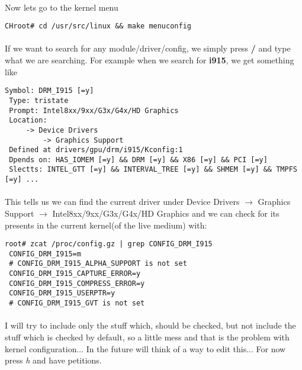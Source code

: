 \documentclass[11pt,a4paper]{article}
\begin{document}
                \paragraph{} Now lets go to the kernel menu

                \begin{lstlisting}[style=BashInputCHRoot]
 CHroot# cd /usr/src/linux && make menuconfig
                \end{lstlisting}

                \paragraph{} If we want to search for any module/driver/config, we simply press \textbf{/} and type what we are searching. For example when we search for \textbf{i915}, we get something like

                \begin{lstlisting}[style=KernelConfig]
 Symbol: DRM_I915 [=y]
 Type: tristate
 Prompt: Intel8xx/9xx/G3x/G4x/HD Graphics
 Location:
     -> Device Drivers
         -> Graphics Support
 Defined at drivers/gpu/drm/i915/Kconfig:1
 Dpends on: HAS_IOMEM [=y] && DRM [=y] && X86 [=y] && PCI [=y]
 Slectts: INTEL_GTT [=y] && INTERVAL_TREE [=y] && SHMEM [=y] && TMPFS [=y] ...
                \end{lstlisting}

                \paragraph{} This tells us we can find the current driver under Device Drivers $ \rightarrow $ Graphics Support $ \rightarrow $ Intel8xx/9xx/G3x/G4x/HD Graphics and we can check for its presents in the current kernel(of the live medium) with:

                \begin{lstlisting}[style=BashInputRoot]
root# zcat /proc/config.gz | grep CONFIG_DRM_I915
 CONFIG_DRM_I915=m
 # CONFIG_DRM_I915_ALPHA_SUPPORT is not set
 CONFIG_DRM_I915_CAPTURE_ERROR=y
 CONFIG_DRM_I915_COMPRESS_ERROR=y
 CONFIG_DRM_I915_USERPTR=y
 # CONFIG_DRM_I915_GVT is not set
                \end{lstlisting}

                \paragraph{} I will try to include only the stuff which, should be checked, but not include the stuff which is checked by default, so a little mess and that is the problem with kernel configuration... In the future will think of a way to edit this... For now press \textit{h} and have petitions.
\end{document}
